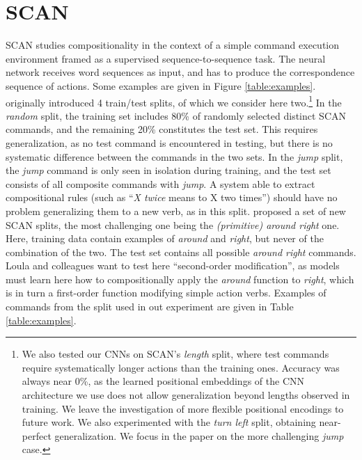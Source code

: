 \section{SCAN}
\label{sec:setup}

SCAN studies compositionality in the context of a simple command
execution environment framed as a supervised sequence-to-sequence
task. The neural network receives word sequences as input, and has to
produce the correspondence sequence of actions. Some examples are
given in Figure \ref{table:examples}.
   originally introduced 4
train/test splits, of which we consider here two.\footnote{We also
  tested our CNNs on SCAN's \emph{length} split, where test commands
  require systematically longer actions than the training
  ones. Accuracy was always near 0\%, as the learned positional
  embeddings of the CNN architecture we use does not allow
  generalization beyond lengths observed in training. We leave the
  investigation of more flexible positional encodings \cite[as in,
  e.g.,][]{vaswani:etal:2017} to future work. We also experimented
  with the \emph{turn left} split, obtaining near-perfect
  generalization. We focus in the paper on the more challenging
  \emph{jump} case.} In the \emph{random} split, the training set
includes 80\% of randomly selected distinct SCAN commands, and the
remaining 20\% constitutes the test set. This requires generalization,
as no test command is encountered in testing, but there is no
systematic difference between the commands in the two sets.  In the
\emph{jump} split, the \emph{jump} command is only seen in isolation
during training, and the test set consists of all composite commands
with \emph{jump}. A system able to extract compositional rules (such
as ``\emph{X twice} means to X two times'') should have no problem
generalizing them to a new verb, as in this
split.  proposed a set of new SCAN splits,
the most challenging one being the \emph{(primitive) around right}
one.  Here, training data contain examples of \emph{around} and
\emph{right}, but never of the combination of the two. The test set
contains all possible \emph{around right} commands. Loula and
colleagues want to test here ``second-order modification'', as models
must learn here how to compositionally apply the \emph{around}
function to \emph{right}, which is in turn a first-order function
modifying simple action verbs. Examples of commands from the split
used in out experiment are given in Table \ref{table:examples}.

